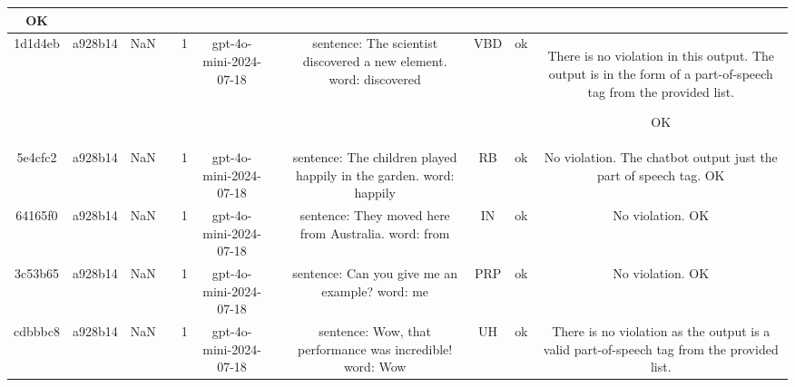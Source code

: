 \begin{table}[h!]
\begin{tabular}{|c|c|c|c|c|c|c|c|c|c|c|}
OK\\
\hline
1d1d4eb & a928b14 & NaN &  & 1 & gpt-4o-mini-2024-07-18 &  & sentence: The scientist discovered a new element. word: discovered & VBD & ok & There is no violation in this output. The output is in the form of a part-of-speech tag from the provided list.

OK\\
\hline
5e4cfc2 & a928b14 & NaN &  & 1 & gpt-4o-mini-2024-07-18 &  & sentence: The children played happily in the garden. word: happily & RB & ok & No violation. The chatbot output just the part of speech tag. 
OK\\
\hline
64165f0 & a928b14 & NaN &  & 1 & gpt-4o-mini-2024-07-18 &  & sentence: They moved here from Australia. word: from & IN & ok & No violation.
OK\\
\hline
3c53b65 & a928b14 & NaN &  & 1 & gpt-4o-mini-2024-07-18 &  & sentence: Can you give me an example? word: me & PRP & ok & No violation.
OK\\
\hline
cdbbbc8 & a928b14 & NaN &  & 1 & gpt-4o-mini-2024-07-18 &  & sentence: Wow, that performance was incredible! word: Wow & UH & ok & There is no violation as the output is a valid part-of-speech tag from the provided list. 


\end{tabular}
\end{table}
